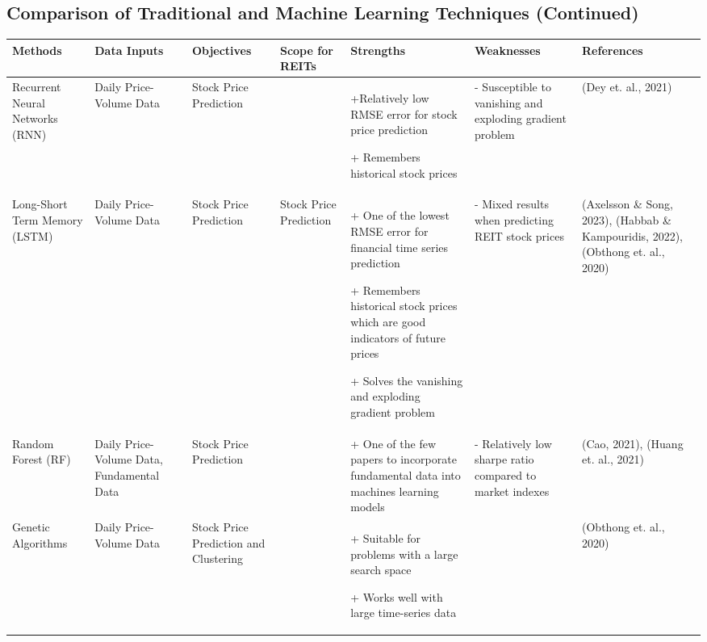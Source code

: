 \documentclass[a4paper,12pt]{report}
\numberwithin{equation}{section}
\theoremstyle{definition}
\begin{document}
\begin{landscape}
  \section{Comparison of Traditional and Machine Learning Techniques (Continued)}
  \begin{table}[H]
    \begin{adjustwidth}{-1.25cm}{-1.25cm}
    \begin{tabular}{|p{2.6cm}|p{2.7cm}|p{2.7cm}|p{3.5cm}|p{5cm}|p{5cm}|p{4cm}|}
    \hline
    \textbf{Methods} & \textbf{Data Inputs} & \textbf{Objectives} & \textbf{Scope for REITs} & \textbf{Strengths} & \textbf{Weaknesses} & \textbf{References}  
    \\ \hline\rowcolor[gray]{.8}Recurrent Neural Networks (RNN) & Daily Price-Volume Data & Stock Price Prediction & & +Relatively low RMSE error for stock price prediction\par + Remembers historical stock prices & - Susceptible to vanishing and exploding gradient problem & (Dey et. al., 2021) 
    \\ \hline Long-Short Term Memory (LSTM) & Daily Price-Volume Data & Stock Price Prediction & Stock Price Prediction & + One of the lowest RMSE error for financial time series prediction \par+ Remembers historical stock prices which are good indicators of future prices \par+ Solves the vanishing and exploding gradient problem & - Mixed results when predicting REIT stock prices & (Axelsson \& Song, 2023),   (Habbab \& Kampouridis, 2022), (Obthong et. al., 2020) 
    \\ \hline\rowcolor[gray]{.8} Random Forest (RF) & Daily Price-Volume Data, Fundamental Data & Stock Price Prediction & & + One of the few papers to incorporate fundamental data into machines learning models & - Relatively low sharpe ratio compared to market indexes & (Cao, 2021), (Huang et. al., 2021)  
    \\ \hline Genetic Algorithms & Daily Price-Volume Data & Stock Price Prediction and Clustering & & + Suitable for problems with a large search space \par+ Works well with large time-series data & & (Obthong et. al., 2020) 
    \\ \hline
    \end{tabular}
  \end{adjustwidth}
  \end{table}



  
\end{landscape}
\end{document}
